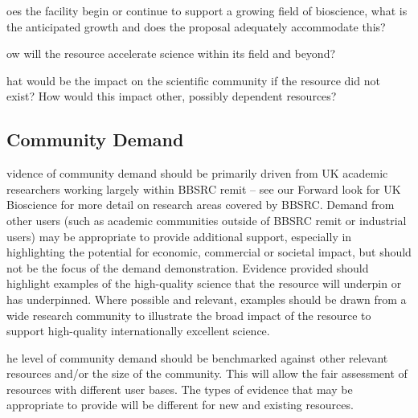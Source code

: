 \documentclass[a4paper,11point]{article}
\def\ii#1\par{{\color{blue!40}\sl #1}\par}
\def\iitem#1\par{\ii\begin{itemize}[nosep]\item #1 \end{itemize}\par}
\begin{document}
\iitem{Significant technical details for the development, maintenance or 
enhancement of the resource must be clearly outlined and indicated 
how this is of internationally exceptional quality. }

\iitem{If applicable, outline any proposed research efforts and how they 
  directly facilitate development of the resource. }

\iitem{For proposals looking to focus on maintaining status quo for an 
existing resource instead of suggesting further development, you 
should detail evidence of why significant upgrades are not required at 
this time and detail why the resource needs continued support to 
maintain world-leading functionality.}

\ii{Additional questions that may be considered: }

\iitem Does the facility begin or continue to support a growing field of 
bioscience, what is the anticipated growth and does the proposal 
adequately accommodate this? 

\iitem How will the resource accelerate science within its field and
  beyond?

\iitem What would be the impact on the scientific community if the resource 
did not exist? How would this impact other, possibly dependent 
resources?

\subsection{Community Demand}
\ii Evidence of community demand should be primarily driven from UK 
academic researchers working largely within BBSRC remit – see our 
Forward look for UK Bioscience for more detail on research areas covered by 
BBSRC. Demand from other users (such as academic communities outside 
of BBSRC remit or industrial users) may be appropriate to provide additional 
support, especially in highlighting the potential for economic, commercial or 
societal impact, but should not be the focus of the demand demonstration. 
Evidence provided should highlight examples of the high-quality science that 
the resource will underpin or has underpinned. Where possible and relevant, 
examples should be drawn from a wide research community to illustrate the 
broad impact of the resource to support high-quality internationally excellent 
science.  

\ii The level of community demand should be benchmarked against other 
relevant resources and/or the size of the community. This will allow the fair 
assessment of resources with different user bases. The types of evidence 
that may be appropriate to provide will be different for new and existing 
resources. 
\end{document}
